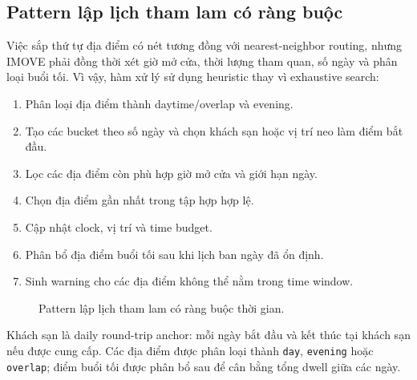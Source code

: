 \documentclass[12pt,a4paper]{article}
\begin{document}
\subsection{Pattern lập lịch tham lam có ràng buộc}


Việc sắp thứ tự địa điểm có nét tương đồng với nearest-neighbor routing, nhưng IMOVE phải đồng thời xét giờ mở cửa, thời lượng tham quan, số ngày và phân loại buổi tối.
Vì vậy, hàm xử lý sử dụng heuristic thay vì exhaustive search:

\begin{enumerate}
    \item Phân loại địa điểm thành daytime/overlap và evening.
    \item Tạo các bucket theo số ngày và chọn khách sạn hoặc vị trí neo làm điểm bắt đầu.
    \item Lọc các địa điểm còn phù hợp giờ mở cửa và giới hạn ngày.
    \item Chọn địa điểm gần nhất trong tập hợp hợp lệ.
    \item Cập nhật clock, vị trí và time budget.
    \item Phân bổ địa điểm buổi tối sau khi lịch ban ngày đã ổn định.
    \item Sinh warning cho các địa điểm không thể nằm trong time window.
\end{enumerate}

\begin{figure}[H]
\centering
{}
\caption{Pattern lập lịch tham lam có ràng buộc thời gian.}
\label{fig:greedy-pattern}
\end{figure}

Khách sạn là daily round-trip anchor: mỗi ngày bắt đầu và kết thúc tại khách sạn nếu được cung cấp. Các địa điểm được phân loại thành \texttt{day}, \texttt{evening} hoặc \texttt{overlap}; điểm buổi tối được phân bổ sau để cân bằng tổng dwell giữa các ngày.
\end{document}
